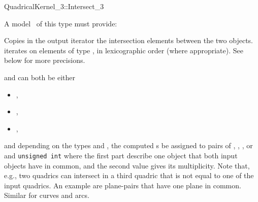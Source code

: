 \begin{ccRefFunctionObjectConcept}{QuadricalKernel_3::Intersect_3}

\ccRefines



A model \ccVar\ of this type must provide:

{Copies in the output iterator the intersection elements between the
two objects.  iterates on
elements of type , in lexicographic order
(where appropriate). See below for more precisions.}


 and  can both 
be either

\begin{itemize}
\item {} ,
\item {} ,
\item {} ,
\end{itemize} 

and depending on the types  and , the computed 
s be assigned to pairs of
, , , or 
and {\tt unsigned int} where the first part describe
one object that both input objects have in common, and the second
value gives its multiplicity. Note that, e.g., two quadrics
can intersect in a third quadric that is not equal to one of the input
quadrics. An example are plane-pairs that have one plane in common.
Similar for curves and arcs.

\end{ccRefFunctionObjectConcept}
